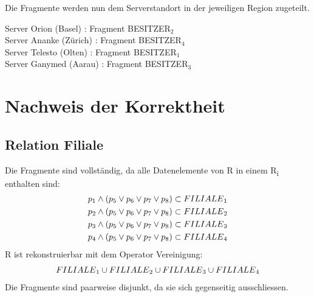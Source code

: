 \documentclass[11pt,a4paper,parskip=half]{scrartcl}
\begin{document}
Die Fragmente werden nun dem Serverstandort in der jeweiligen Region zugeteilt.

Server Orion (Basel) : Fragment BESITZER$_2$\\
Server Ananke (Zürich) : Fragment BESITZER$_4$\\
Server Telesto (Olten) : Fragment BESITZER$_1$\\
Server Ganymed (Aarau) : Fragment BESITZER$_3$


\section{Nachweis der Korrektheit}
\subsection{Relation Filiale}
Die Fragmente sind vollständig, da alle Datenelemente von R in einem R\textsubscript{i} enthalten sind:\\
\begin{align*}
p\textsubscript{1} \wedge (p\textsubscript{5} \vee p\textsubscript{6} \vee p\textsubscript{7} \vee p\textsubscript{8}) \subset  FILIALE\textsubscript{1}\\
p\textsubscript{2} \wedge (p\textsubscript{5} \vee p\textsubscript{6} \vee p\textsubscript{7} \vee p\textsubscript{8}) \subset  FILIALE\textsubscript{2}\\
p\textsubscript{3} \wedge (p\textsubscript{5} \vee p\textsubscript{6} \vee p\textsubscript{7} \vee p\textsubscript{8}) \subset  FILIALE\textsubscript{3}\\
p\textsubscript{4} \wedge (p\textsubscript{5} \vee p\textsubscript{6} \vee p\textsubscript{7} \vee p\textsubscript{8}) \subset  FILIALE\textsubscript{4}\\
\end{align*}
R ist rekonstruierbar mit dem Operator Vereinigung:\\
\begin{align*}
FILIALE\textsubscript{1} \cup FILIALE\textsubscript{2} \cup FILIALE\textsubscript{3} \cup FILIALE\textsubscript{4}\\
\end{align*}
Die Fragmente sind paarweise disjunkt, da sie sich gegenseitig ausschliessen.
\end{document}
